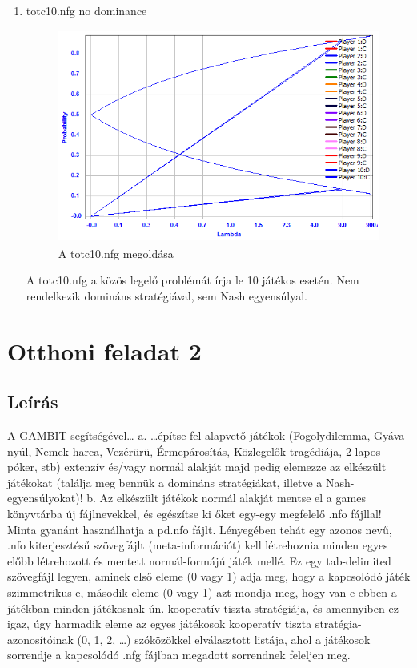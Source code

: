 \begin{enumerate}
\item totc10.nfg
		no dominance
		\begin{figure}[h]
		\begin{center}
		\includegraphics[height=7cm]{figures/tot.png}
		\caption{A totc10.nfg megoldása}
		\end{center}
		\end{figure}
A totc10.nfg a közös legelő problémát írja le 10 játékos esetén. Nem rendelkezik domináns stratégiával, sem Nash egyensúlyal.
		
\end{enumerate}
\section{Otthoni feladat 2}
\subsection{Leírás}
A GAMBIT segítségével… a. …építse fel alapvető játékok (Fogolydilemma, Gyáva nyúl, Nemek harca, Vezérürü, Érmepárosítás, Közlegelők tragédiája, 2-lapos póker, stb) extenzív és/vagy normál alakját majd pedig elemezze az elkészült játékokat (találja meg bennük a domináns stratégiákat, illetve a Nash-egyensúlyokat)! b. Az elkészült játékok normál alakját mentse el a games könyvtárba új fájlnevekkel, és egészítse ki őket egy-egy megfelelő .nfo fájllal! Minta gyanánt használhatja a pd.nfo fájlt. Lényegében tehát egy azonos nevű, .nfo kiterjesztésű szövegfájlt (meta-információt) kell létrehoznia minden egyes előbb létrehozott és mentett normál-formájú játék mellé. Ez egy tab-delimited szövegfájl legyen, aminek első eleme (0 vagy 1) adja meg, hogy a kapcsolódó játék szimmetrikus-e, második eleme (0 vagy 1) azt mondja meg, hogy van-e ebben a játékban minden játékosnak ún. kooperatív tiszta stratégiája, és amennyiben ez igaz, úgy harmadik eleme az egyes játékosok kooperatív tiszta stratégia-azonosítóinak (0, 1, 2, …) szóközökkel elválasztott listája, ahol a játékosok sorrendje a kapcsolódó .nfg fájlban megadott sorrendnek feleljen meg.

